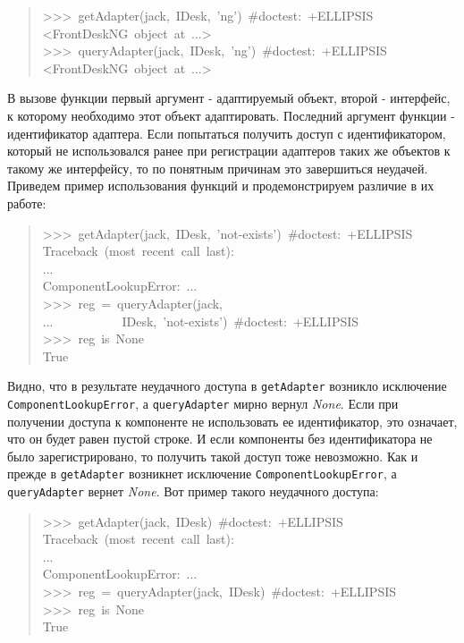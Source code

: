 \documentclass[14pt,a4paper,openany,twoside,final]{extbook}
\providecommand*{\DUroletitlereference}[1]{\textsl{#1}}
\begin{document}
\begin{quote}{\ttfamily \raggedright \noindent
>{}>{}>~getAdapter(jack,~IDesk,~'ng')~\#doctest:~+ELLIPSIS\\
<FrontDeskNG~object~at~...>\\
>{}>{}>~queryAdapter(jack,~IDesk,~'ng')~\#doctest:~+ELLIPSIS\\
<FrontDeskNG~object~at~...>
}
\end{quote}

В вызове функции первый аргумент - адаптируемый объект, второй -
интерфейс, к которому необходимо этот объект адаптировать.  Последний
аргумент функции - идентификатор адаптера.  Если попытаться получить
доступ с идентификатором, который не использовался ранее при
регистрации адаптеров таких же объектов к такому же интерфейсу, то по
понятным причинам это завершиться неудачей.  Приведем пример использования
функций и продемонстрируем различие в их работе:

\begin{quote}{\ttfamily \raggedright \noindent
>{}>{}>~getAdapter(jack,~IDesk,~'not-exists')~\#doctest:~+ELLIPSIS\\
Traceback~(most~recent~call~last):\\
...\\
ComponentLookupError:~...\\
>{}>{}>~reg~=~queryAdapter(jack,\\
...~~~~~~~~~~~IDesk,~'not-exists')~\#doctest:~+ELLIPSIS\\
>{}>{}>~reg~is~None\\
True
}
\end{quote}

Видно, что в результате неудачного доступа в \texttt{getAdapter} возникло
исключение \texttt{ComponentLookupError}, а \texttt{queryAdapter} мирно вернул
\DUroletitlereference{None}.  Если при получении доступа к компоненте не использовать ее
идентификатор, это означает, что он будет равен пустой строке.  И если
компоненты без идентификатора не было зарегистрировано, то получить
такой доступ тоже невозможно.  Как и прежде в \texttt{getAdapter} возникнет
исключение \texttt{ComponentLookupError}, а \texttt{queryAdapter} вернет
\DUroletitlereference{None}.  Вот пример такого неудачного доступа:

\begin{quote}{\ttfamily \raggedright \noindent
>{}>{}>~getAdapter(jack,~IDesk)~\#doctest:~+ELLIPSIS\\
Traceback~(most~recent~call~last):\\
...\\
ComponentLookupError:~...\\
>{}>{}>~reg~=~queryAdapter(jack,~IDesk)~\#doctest:~+ELLIPSIS\\
>{}>{}>~reg~is~None\\
True
}
\end{quote}
\end{document}
